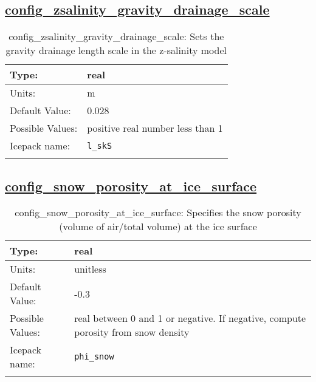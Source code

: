 \subsection[config\_zsalinity\_gravity\_drainage\_scale]{\hyperref[sec:nm_tab_biogeochemistry]{config\_zsalinity\_gravity\_drainage\_scale}}
\label{subsec:nm_sec_config_zsalinity_gravity_drainage_scale}
\begin{center}
\begin{longtable}{| p{2.0in} || p{4.0in} |}
    \hline
    Type: & real \\
    \hline
    Units: & \si{m} \\
    \hline
    Default Value: & 0.028 \\
    \hline
    Possible Values: & positive real number less than 1 \\
    \hline
    Icepack name: & \verb+l_skS+ \\
    \hline
    \caption{config\_zsalinity\_gravity\_drainage\_scale: Sets the gravity drainage length scale in the z-salinity model}
\end{longtable}
\end{center}
\subsection[config\_snow\_porosity\_at\_ice\_surface]{\hyperref[sec:nm_tab_biogeochemistry]{config\_snow\_porosity\_at\_ice\_surface}}
\label{subsec:nm_sec_config_snow_porosity_at_ice_surface}
\begin{center}
\begin{longtable}{| p{2.0in} || p{4.0in} |}
    \hline
    Type: & real \\
    \hline
    Units: & \si{unitless} \\
    \hline
    Default Value: & -0.3 \\
    \hline
    Possible Values: & real between 0 and 1 or negative.  If negative, compute porosity from snow density \\
    \hline
    Icepack name: & \verb+phi_snow+ \\
    \hline
    \caption{config\_snow\_porosity\_at\_ice\_surface: Specifies the snow porosity (volume of air/total volume) at the ice surface}
\end{longtable}
\end{center}
